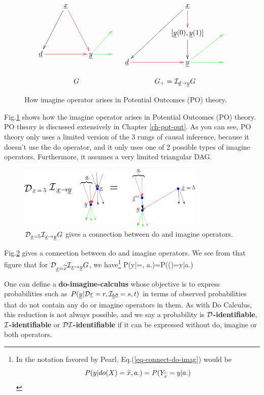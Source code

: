 \begin{figure}[h!]
$$
\begin{array}{ccccc}
\xymatrix{
&\rvx\ar@[red][ddr]\ar[ddl]
\\
&&&
\\
\rvd\ar@[red][rr]
&
&\rvy\ar@[green][r]
\ar@[green][ur]
&
}
&
\xymatrix{
&&\rvx\ar[ddll]\ar@[red][d]
\\
&&[\rvy(0),\rvy(1)]\ar[d]
&
\\
\rvd\ar@[red][rr]
&
&\rvy\ar@[green][r]
\ar@[green][ur]
&
}
\\
\\
G&G_+=\cali_{\rvd\rarrow\rvy}G
\end{array}
$$
\caption{How
 imagine operator
arises in
Potential Outcomes (PO)
theory.
}
\label{fig-counterf-G-im-y0-y1}
\end{figure}
Fig.\ref{fig-counterf-G-im-y0-y1}
shows how the
imagine operator arises
in Potential Outcomes (PO) theory.
PO theory is discussed extensively
in Chapter \ref{ch-pot-out}.
As you can see, PO theory
only uses a limited version
of the 3 rungs
of causal inference, because it
doesn't use the do operator,
and it only uses one
of 2 possible types of
imagine operators.
Furthermore,
it assumes a
very limited triangular DAG.


\begin{figure}[h!]
\centering
\includegraphics[width=3.5in]
{counterf/rho-kappa.png}
\caption{$\cald_{\rvx=5}\cali_{\rvx\rarrow \rvy}G$
gives a connection
between do and imagine operators.
}
\label{fig-rho-kappa}
\end{figure}

Fig.\ref{fig-rho-kappa}
gives  a connection
between do and imagine
operators.
We see
from that figure that
for $\cald_{\rvx=\TIL{x}}
\cali_{\rvx\rarrow\rvy}G$, we have\footnote{In the
notation favored by Pearl, Eq.(\ref{eq-connect-do-imag})
 would be
$$P(y|do(X)={\widetilde{x}}, a.)=P(Y_{{\widetilde{x}}}=y|a.)$$}
\beq
P(y|\cald\rvx=, a.)=P(\rvy()=y|a.)
\label{eq-connect-do-imag}
\eeq


One can define
a {\bf do-imagine-calculus}
whose
objective
is to
express
probabilities such as
$P(\rvy|\cald\rvr=r,
\cali_\rvb \rvs=s, t)$
in terms of observed
probabilities
that do not
contain
any do or imagine
operators in them.
As with
Do Calculus,
this reduction
is not
always possible,
and we say a probability is
{\bf ${\cal D}$-identifiable},
{\bf ${\cal I}$-identifiable}
or
{\bf ${\cal D}{\cal I}$-identifiable}
if it  can be
expressed without do, imagine
or both operators.

